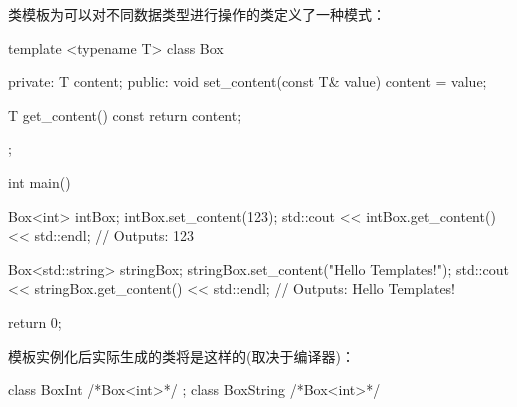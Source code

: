 
类模板为可以对不同数据类型进行操作的类定义了一种模式：

\begin{cpp}
template <typename T>
class Box {
private:
    T content;
public:
    void set_content(const T& value) {
        content = value;
    }

    T get_content() const {
        return content;
    }
};

int main() {
    Box<int> intBox;
    intBox.set_content(123);
    std::cout << intBox.get_content() << std::endl; // Outputs: 123

    Box<std::string> stringBox;
    stringBox.set_content("Hello Templates!");
    std::cout << stringBox.get_content() << std::endl; // Outputs: Hello Templates!

    return 0;
}
\end{cpp}

模板实例化后实际生成的类将是这样的(取决于编译器)：

\begin{cpp}
class BoxInt { /*Box<int>*/ };
class BoxString { /*Box<int>*/ }
\end{cpp}




